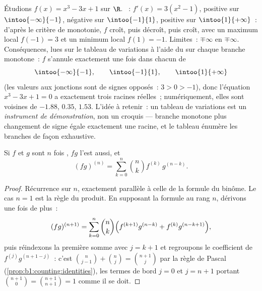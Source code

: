 \begin{example}\label{ex:b1:derivative:variations}
Étudions $f(x) = x^3 - 3x + 1$ sur $\R$. ~: $f'(x) =
3(x^2 - 1)$, positive sur $\intoo{-\infty}{-1}$, négative sur
$\intoo{-1}{1}$, positive sur $\intoo{1}{+\infty}$~: d'après le
critère de monotonie, $f$ croît, puis décroît, puis
croît, avec un maximum local $f(-1) = 3$ et un minimum local
$f(1) = -1$. Limites~: $\mp\infty$ en $\mp\infty$. Conséquences,
lues sur le tableau de variations à l'aide du  sur chaque branche monotone~: $f$ s'annule exactement une fois
dans chacun de
\[
\intoo{-\infty}{-1}, \qquad \intoo{-1}{1}, \qquad
\intoo{1}{+\infty}
\]
(les valeurs aux jonctions sont de signes opposés~: $3 > 0 > -1$),
donc l'équation $x^3 - 3x + 1 = 0$ a exactement trois racines
réelles~; numériquement, elles sont voisines de $-1.88$, $0.35$, $1.53$. L'idée
à retenir~: un tableau de variations est un \emph{instrument de démonstration},
non un croquis --- branche monotone plus changement de signe égale
exactement une racine, et le tableau énumère les branches de
façon exhaustive.
\end{example}

\begin{theorem}\label{thm:b1:derivative:leibniz}
Si $f$ et $g$ sont $n$ fois , $fg$ l'est aussi,
et
\[
(fg)^{(n)} = \sum_{k=0}^{n} \binom nk f^{(k)}\, g^{(n-k)} .
\]
\end{theorem}

\begin{proof}
Récurrence sur $n$, exactement parallèle à celle de la formule du
binôme. Le cas $n = 1$ est la règle du produit. En supposant la formule au rang
$n$, dérivons une fois de plus~:
\[
(fg)^{(n+1)} = \sum_{k=0}^{n} \binom nk
\Bigl( f^{(k+1)} g^{(n-k)} + f^{(k)} g^{(n-k+1)} \Bigr),
\]
puis réindexons la première somme avec $j = k + 1$ et regroupons le
coefficient de $f^{(j)} g^{(n+1-j)}$~: c'est $\binom{n}{j-1} +
\binom nj = \binom{n+1}{j}$ par la règle de Pascal
(\cref{prop:b1:counting:identities}), les termes de bord $j = 0$
et $j = n + 1$ portant $\binom{n+1}{0} = \binom{n+1}{n+1} =
1$ comme il se doit.
\end{proof}

